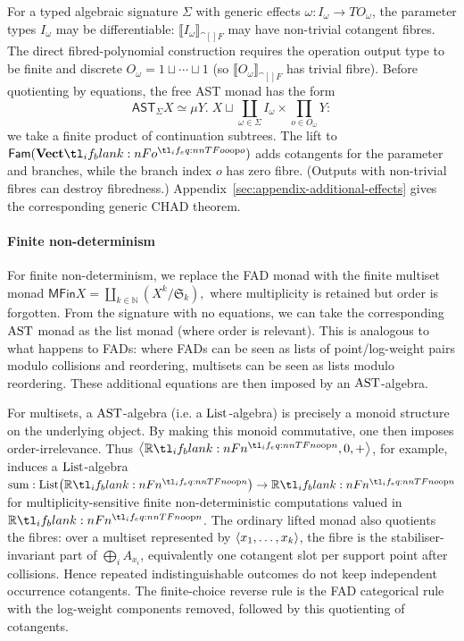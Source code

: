 \documentclass[11pt,a4paper]{article}
\theoremstyle{definition}
\theoremstyle{remark}
\providecommand{\N}{\mathbb{N}}
\providecommand{\AST}{\mathsf{AST}}
\providecommand{\Fam}[1]{\mathsf{Fam}(#1)}
\providecommand{\fvoint}[1]{\llbracket #1\rrbracket_{\cat[]{F}}}
\providecommand{\MFin}{\mathsf{MFin}}
\begin{document}
For a typed algebraic signature \(\Sigma\) with generic effects \( \omega:I_{\omega}\to T O_{\omega} \), the parameter types \(I_\omega\) may be differentiable: \(\fvoint{I_{\omega}}\) may have non-trivial cotangent fibres. The direct fibred-polynomial construction requires the operation output type to be finite and discrete \(O_\omega= 1\sqcup \cdots\sqcup 1\) (so \(\fvoint{O_{\omega}}\) has trivial fibre). Before quotienting by equations, the free AST monad has the form
\[
  \AST_{\Sigma}X
  \simeq
  \mu Y.\;
  X \sqcup
  \coprod_{\omega\in\Sigma}
  I_{\omega}\times
  \prod_{o\in O_{\omega}}Y:
\]
we take a finite product of continuation subtrees. The lift to \( \Fam{\Vect[o]} \) adds cotangents  for the parameter and branches, while the branch index \(o\) has zero fibre. (Outputs with non-trivial fibres can destroy fibredness.) Appendix~\ref{sec:appendix-additional-effects} gives the corresponding generic CHAD theorem.


\paragraph{Finite non-determinism}
For finite non-determinism, we replace the FAD monad with the finite multiset monad
\(
  \MFin X = \coprod_{k \in \N} \left(X^{k}/\mathfrak{S}_{k}\right),
\)
where multiplicity is retained but order is forgotten. From the signature with no equations, we can take the corresponding \( \opn{AST} \) monad as the list monad (where order is relevant). This is analogous to what happens to FADs: where FADs can be seen as lists of point/log-weight pairs modulo collisions and reordering, multisets can be seen as lists modulo reordering. These additional equations are then imposed by an \( \opn{AST} \)-algebra.

For multisets, a \( \opn{AST} \)-algebra (i.e. a \( \opn{List} \)-algebra) is precisely a monoid structure on the underlying object. By making this monoid commutative, one then imposes order-irrelevance. Thus \( \tuple{\R[n],0,+} \), for example, induces a \( \opn{List} \)-algebra \( \opn{sum}: \Fun[np]{ \opn{List} }{ \R[n] } \to \R[n] \) for multiplicity-sensitive finite non-deterministic computations valued in \( \R[n] \). The ordinary lifted monad also quotients the fibres: over a multiset represented by \( \left\langle x_{1},\dots,x_{k}\right\rangle \), the fibre is the stabiliser-invariant part of \( \bigoplus_i A_{x_i} \), equivalently one cotangent slot per support point after collisions. Hence repeated indistinguishable outcomes do not keep independent occurrence cotangents. The finite-choice reverse rule is the FAD categorical rule with the log-weight components removed, followed by this quotienting of cotangents.
\end{document}
